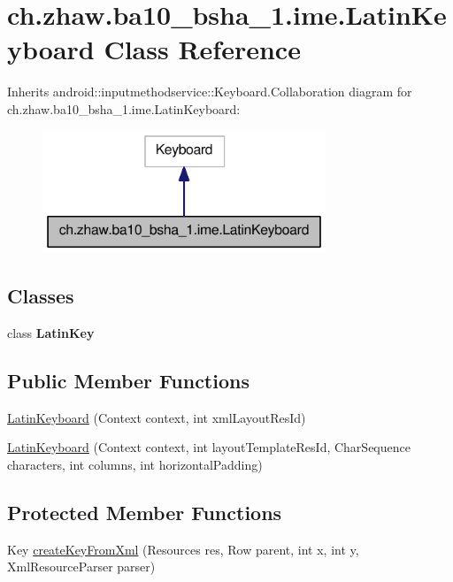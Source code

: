 \hypertarget{classch_1_1zhaw_1_1ba10__bsha__1_1_1ime_1_1LatinKeyboard}{
\section{ch.zhaw.ba10\_\-bsha\_\-1.ime.LatinKeyboard Class Reference}
\label{classch_1_1zhaw_1_1ba10__bsha__1_1_1ime_1_1LatinKeyboard}
}


Inherits android::inputmethodservice::Keyboard.Collaboration diagram for ch.zhaw.ba10\_\-bsha\_\-1.ime.LatinKeyboard:\nopagebreak
\begin{figure}[H]
\begin{center}
\leavevmode
\includegraphics[width=240pt]{classch_1_1zhaw_1_1ba10__bsha__1_1_1ime_1_1LatinKeyboard__coll__graph}
\end{center}
\end{figure}
\subsection*{Classes}
\begin{DoxyCompactItemize}
\item 
class {\bfseries LatinKey}
\end{DoxyCompactItemize}
\subsection*{Public Member Functions}
\begin{DoxyCompactItemize}
\item 
\hyperlink{classch_1_1zhaw_1_1ba10__bsha__1_1_1ime_1_1LatinKeyboard_acc26ef16ae49f4b555f375e831b322c0}{LatinKeyboard} (Context context, int xmlLayoutResId)
\item 
\hyperlink{classch_1_1zhaw_1_1ba10__bsha__1_1_1ime_1_1LatinKeyboard_a2614bb0eacfd8a278475184346b05820}{LatinKeyboard} (Context context, int layoutTemplateResId, CharSequence characters, int columns, int horizontalPadding)
\end{DoxyCompactItemize}
\subsection*{Protected Member Functions}
\begin{DoxyCompactItemize}
\item 
Key \hyperlink{classch_1_1zhaw_1_1ba10__bsha__1_1_1ime_1_1LatinKeyboard_a1aaff47f24e478664fe1c8b376849f2e}{createKeyFromXml} (Resources res, Row parent, int x, int y, XmlResourceParser parser)
\end{DoxyCompactItemize}
